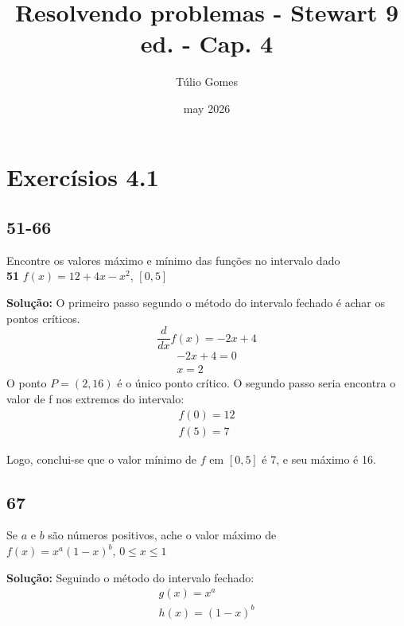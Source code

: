 \title{Resolvendo problemas - Stewart 9 ed. - Cap. 4}
\author{Túlio Gomes}
\date{may 2026}

\maketitle

\section{Exercísios 4.1}
\subsection{51-66}
Encontre os valores máximo e mínimo das funções no intervalo dado \\
\textbf{51} $f(x) = 12 + 4x -x^2$, $[0, 5]$

\textbf{Solução:} O primeiro passo segundo o método do intervalo fechado é achar os pontos críticos.
\begin{equation}
    \frac{d}{dx}f(x) = -2x + 4
\end{equation}
\begin{equation}
    \begin{split}        
        -2x + 4 = 0 \\
        x = 2
    \end{split}
\end{equation}
O ponto $P=(2, 16)$ é o único ponto crítico.
O segundo passo seria encontra o valor de f nos extremos do intervalo:
\begin{equation}
    \begin{split}
        f(0) = 12 \\
        f(5) = 7
    \end{split}
\end{equation}

Logo, conclui-se que o valor mínimo de $f$ em $[0, 5]$ é 7, e seu máximo é 16.

\subsection{67} 
Se $a$ e $b$ são números positivos, ache o valor máximo de \\
 $f(x) = x^a(1-x)^b$, $0 \leqslant x \leqslant 1$

 \textbf{Solução:} Seguindo o método do intervalo fechado: 
 \begin{equation}
    \begin{split}
        g(x) = x^a \\
        h(x) = (1-x)^b        
    \end{split}
 \end{equation}

